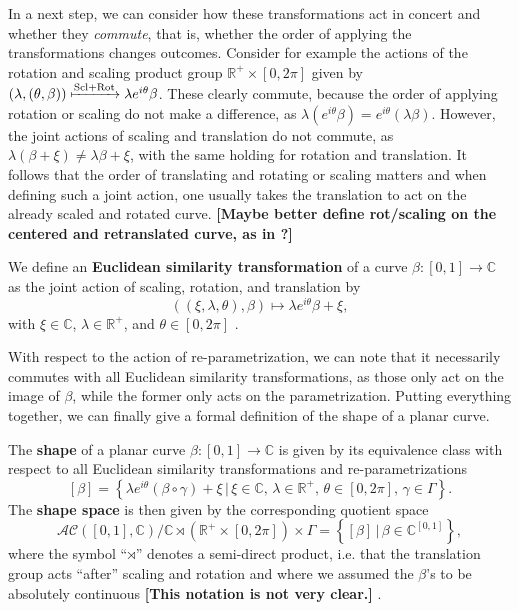 In a next step, we can consider how these transformations act in concert and whether they \textit{commute}, that is, whether the order of applying the transformations changes outcomes.
Consider for example the actions of the rotation and scaling product group $\mathbb{R}^+ \times [0,2\pi]$ given by $(\lambda, (\theta, \beta)) \xmapsto{\text{Scl} + \text{Rot}} \lambda e^{i\theta} \beta$.
These clearly commute, because the order of applying rotation or scaling do not make a difference, as $\lambda(e^{i\theta}\beta) = e^{i\theta}(\lambda\beta)$.
However, the joint actions of scaling and translation do not commute, as $\lambda(\beta + \xi) \neq \lambda\beta + \xi$, with the same holding for rotation and translation.
It follows that the order of translating and rotating or scaling matters and when defining such a joint action, one usually takes the translation to act on the already scaled and rotated curve.
\textbf{[Maybe better define rot/scaling on the centered and retranslated curve, as in \cite{Stoecker2021}?]}
\begin{definition} 
  We define an \textbf{Euclidean similarity transformation} of a curve $\beta :
  [0,1] \rightarrow \mathbb{C}$ as the joint action of scaling, rotation, and
  translation by 
  $$((\xi, \lambda, \theta), \beta) \mapsto \lambda e^{i\theta} \beta + \xi,$$
  with $\xi \in \mathbb{C}$, $\lambda \in \mathbb{R}^+$, and $\theta \in
  [0,2\pi]$ \parencite[see][62]{DrydenMardia2016}.
\end{definition}
\noindent With respect to the action of re-parametrization, we can note that it
necessarily commutes with all Euclidean similarity transformations, as those
only act on the image of $\beta$, while the former only acts on the
parametrization.
Putting everything together, we can finally give a formal definition of the
shape of a planar curve.
\begin{definition}[Shape]
  The \textbf{shape} of a planar curve $\beta : [0,1] \rightarrow \mathbb{C}$
  is given by its equivalence class with respect to all Euclidean similarity
  transformations and re-parametrizations
  $$ [\beta] = \left\{\lambda e^{i\theta}(\beta \circ \gamma) + \xi\,|\, \xi
  \in \mathbb{C},\, \lambda \in \mathbb{R}^+,\, \theta \in [0,2\pi],\, \gamma
  \in \Gamma\right\}. $$
  The \textbf{shape space} is then given by the corresponding quotient space 
  $$\mathcal{AC}([0,1], \mathbb{C}) \big/ \mathbb{C} \rtimes \left( \mathbb{R}^+ \times
  [0,2\pi] \right) \times \Gamma = \left\{[\beta]\,|\,\beta \in
  \mathbb{C}^{[0,1]}\right\},$$
  where the symbol \enquote{$\rtimes$} denotes a semi-direct product, i.e. that
  the translation group acts \enquote{after} scaling and rotation and where we assumed the $\beta$'s to be absolutely continuous \textbf{[This notation is not very clear.]}
  \parencite[for details see][Chapter 3]{SrivastavaKlassen2016}.
\end{definition}

